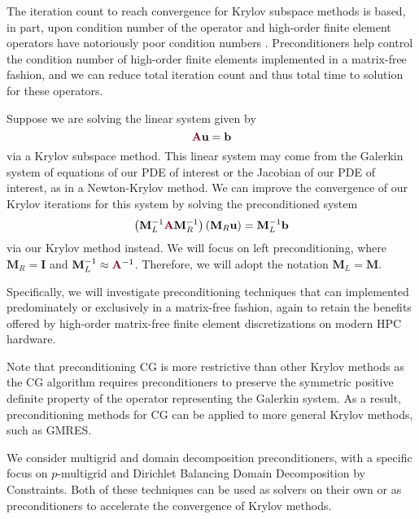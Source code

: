 The iteration count to reach convergence for Krylov subspace methods is based, in part, upon condition number of the operator \cite{luenberger1973introduction} and high-order finite element operators have notoriously poor condition numbers \cite{hu1998bounds}.
Preconditioners help control the condition number of high-order finite elements implemented in a matrix-free fashion, and we can reduce total iteration count and thus total time to solution for these operators.

Suppose we are solving the linear system given by
\begin{equation}
{\color{burgundy}\mathbf{A}} \mathbf{u} = \mathbf{b}
\label{linear_eqn}
\end{equation}
via a Krylov subspace method.
This linear system may come from the Galerkin system of equations of our PDE of interest or the Jacobian of our PDE of interest, as in a Newton-Krylov method.
We can improve the convergence of our Krylov iterations for this system by solving the preconditioned system
\begin{equation}
\left( \mathbf{M}_L^{-1} {\color{burgundy}\mathbf{A}} \mathbf{M}_R^{-1} \right) \left( \mathbf{M}_R \mathbf{u} \right) = \mathbf{M}_L^{-1} \mathbf{b}
\label{precond_eqn}
\end{equation}
via our Krylov method instead.
We will focus on left preconditioning, where $\mathbf{M}_R = \mathbf{I}$ and $\mathbf{M}_L^{-1} \approx {\color{burgundy}\mathbf{A}}^{-1}$.
Therefore, we will adopt the notation $\mathbf{M}_L = \mathbf{M}$.

Specifically, we will investigate preconditioning techniques that can implemented predominately or exclusively in a matrix-free fashion, again to retain the benefits offered by high-order matrix-free finite element discretizations on modern HPC hardware.

Note that preconditioning CG is more restrictive than other Krylov methods as the CG algorithm requires preconditioners to preserve the symmetric positive definite property of the operator representing the Galerkin system.
As a result, preconditioning methods for CG can be applied to more general Krylov methods, such as GMRES.

We consider multigrid and domain decomposition preconditioners, with a specific focus on $p$-multigrid and Dirichlet Balancing Domain Decomposition by Constraints.
Both of these techniques can be used as solvers on their own or as preconditioners to accelerate the convergence of Krylov methods.

